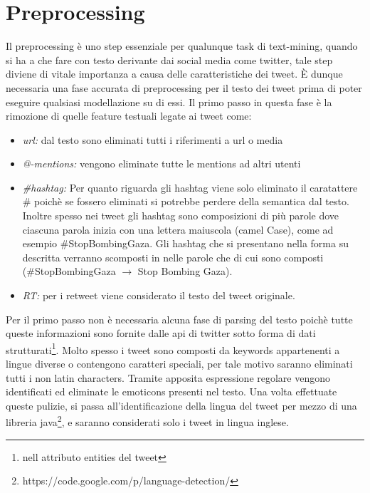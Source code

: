 \documentclass[a4paper,12pt]{report}
\begin{document}
\section{Preprocessing}
Il preprocessing è uno step essenziale per qualunque task di text-mining, quando si ha a che fare con testo derivante dai social media come twitter, tale step diviene di vitale importanza a causa delle caratteristiche dei tweet.
\`E dunque necessaria una fase accurata di preprocessing per il testo dei tweet prima di poter eseguire qualsiasi modellazione su di essi. Il primo passo in questa fase è la rimozione di quelle feature testuali legate ai tweet come:
\begin{itemize}
\item \emph{url:} dal testo sono eliminati tutti i riferimenti a url o media  
\item \emph{@-mentions:} vengono eliminate tutte le mentions ad altri utenti
\item  \emph{\#hashtag:} Per quanto riguarda gli hashtag viene solo eliminato il caratattere   \#   poich\`e se fossero eliminati si potrebbe perdere della semantica dal testo.
Inoltre spesso nei tweet gli hashtag sono composizioni di più parole dove ciascuna parola inizia con una lettera maiuscola (camel Case), come ad esempio \#StopBombingGaza. Gli hashtag che si presentano nella forma su descritta verranno scomposti in nelle parole che di cui sono composti (\#StopBombingGaza $\rightarrow$ Stop Bombing Gaza).
\item \emph{RT:} per i retweet viene considerato il testo del tweet originale.
\end{itemize}
Per il primo passo non è necessaria alcuna fase di parsing del testo poich\`e tutte queste informazioni sono fornite dalle api di twitter sotto forma di dati strutturati\footnote{nell attributo entities del tweet}. Molto spesso i tweet sono composti da keywords appartenenti a lingue diverse o contengono caratteri speciali, per tale motivo saranno eliminati tutti i non latin characters. Tramite apposita espressione regolare vengono identificati ed eliminate le emoticons presenti nel testo. Una volta effettuate queste pulizie, si passa all’identificazione della lingua del tweet per mezzo di una libreria java\footnote{https://code.google.com/p/language-detection/}, e saranno considerati solo i tweet in lingua inglese.
\newpage
\end{document}
